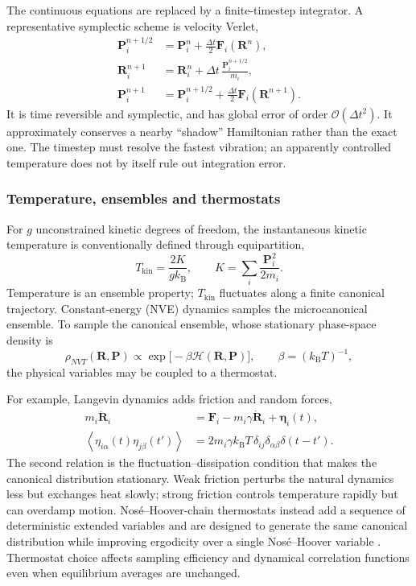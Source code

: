 \documentclass[10pt,a4paper,twocolumn]{article}
\begin{document}
The continuous equations are replaced by a finite-timestep integrator. A
representative symplectic scheme is velocity Verlet,
\begin{align}
  \bm P_i^{n+1/2}
    &=\bm P_i^n+\frac{\Delta t}{2}\bm F_i(\bm R^n),
  \\
  \bm R_i^{n+1}
    &=\bm R_i^n+\Delta t\,\frac{\bm P_i^{n+1/2}}{m_i},
  \\
  \bm P_i^{n+1}
    &=\bm P_i^{n+1/2}
      +\frac{\Delta t}{2}\bm F_i(\bm R^{n+1}).
  \label{eq:velocity-verlet}
\end{align}
It is time reversible and symplectic, and has global error of order
$\mathcal O(\Delta t^2)$. It approximately conserves a nearby ``shadow''
Hamiltonian rather than the exact one. The timestep must resolve the fastest
vibration; an apparently controlled temperature does not by itself rule out
integration error.

\subsubsection{Temperature, ensembles and thermostats}

For $g$ unconstrained kinetic degrees of freedom, the instantaneous kinetic
temperature is conventionally defined through equipartition,
\begin{equation}
  T_{\mathrm{kin}}=\frac{2K}{gk_{\mathrm B}},
  \qquad
  K=\sum_i\frac{\bm P_i^2}{2m_i}.
  \label{eq:kinetic-temperature}
\end{equation}
Temperature is an ensemble property; $T_{\mathrm{kin}}$ fluctuates along a
finite canonical trajectory. Constant-energy (NVE) dynamics samples the
microcanonical ensemble. To sample the canonical ensemble, whose stationary
phase-space density is
\begin{equation}
  \rho_{NVT}(\bm R,\bm P)\propto
  \exp\bigl[-\beta\mathcal H(\bm R,\bm P)\bigr],
  \qquad \beta=(k_{\mathrm B}T)^{-1},
  \label{eq:canonical-density}
\end{equation}
the physical variables may be coupled to a thermostat.

For example, Langevin dynamics adds friction and random forces,
\begin{align}
  m_i\ddot{\bm R}_i
    &=\bm F_i-m_i\gamma\dot{\bm R}_i+\bm\eta_i(t),
  \\
  \left\langle\eta_{i\alpha}(t)\eta_{j\beta}(t')\right\rangle
    &=2m_i\gamma k_{\mathrm B}T\,
      \delta_{ij}\delta_{\alpha\beta}\delta(t-t').
  \label{eq:langevin}
\end{align}
The second relation is the fluctuation--dissipation condition that makes the
canonical distribution stationary. Weak friction perturbs the natural
dynamics less but exchanges heat slowly; strong friction controls temperature
rapidly but can overdamp motion. Nos\'e--Hoover-chain thermostats instead add
a sequence of deterministic extended variables and are designed to generate
the same canonical distribution while improving ergodicity over a single
Nos\'e--Hoover variable \cite{nhc}. Thermostat choice affects sampling
efficiency and dynamical correlation functions even when equilibrium averages
are unchanged.
\end{document}
